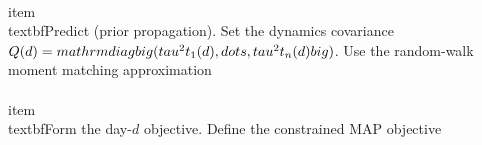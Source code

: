 \documentclass[11pt]{article}
\begin{document}
\\item \\textbf{Predict (prior propagation).}
Set the dynamics covariance
$Q(d)=\\mathrm{diag}\\big(\\tau^2 t_1(d),\\dots,\\tau^2 t_n(d)\\big)$.
Use the random-walk moment matching approximation
\\[\nm^-(d)=\\widehat z(d-1),\n\\qquad\nP^-(d)=\\Sigma(d-1)+Q(d).\n\\]

\\item \\textbf{Form the day-$d$ objective.}
Define the constrained MAP objective
\\[\n\\mathcal J_d(z)=\\mathcal L_d(z)+\\frac12\\big(z-m^-(d)\\big)^\\top\\big(P^-(d)\\big)^{-1}\\big(z-m^-(d)\\big),\n\\qquad \\text{s.t. }\\mathbf 1^\\top z=0.\n\\]
\end{document}
